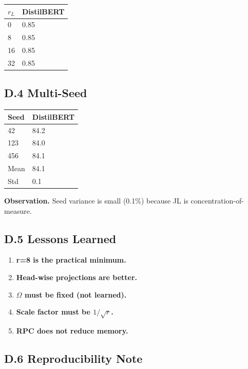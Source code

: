 \begin{table}[H]
\centering
\small
\begin{tabular}{ll}
\toprule
\textbf{$r_L$} & \textbf{DistilBERT} \\
\midrule
0 & 0.85 \\
8 & 0.85 \\
16 & 0.85 \\
32 & 0.85 \\
\bottomrule
\end{tabular}
\end{table}

\subsection{D.4 Multi-Seed}

\begin{table}[H]
\centering
\small
\begin{tabular}{ll}
\toprule
\textbf{Seed} & \textbf{DistilBERT} \\
\midrule
42 & 84.2 \\
123 & 84.0 \\
456 & 84.1 \\
Mean & 84.1 \\
Std & 0.1 \\
\bottomrule
\end{tabular}
\end{table}

\textbf{Observation.} Seed variance is small (0.1\%) because JL is 
concentration-of-measure.

\subsection{D.5 Lessons Learned}

\begin{enumerate}
\item \textbf{r=8 is the practical minimum.}
\item \textbf{Head-wise projections are better.}
\item \textbf{$\Omega$ must be fixed (not learned).}
\item \textbf{Scale factor must be $1/\sqrt{r}$.}
\item \textbf{RPC does not reduce memory.}

\end{enumerate}
\subsection{D.6 Reproducibility Note}

